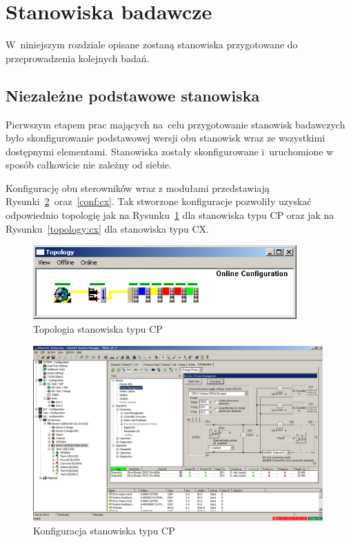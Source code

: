 \section{Stanowiska badawcze}
W~niniejszym rozdziale opisane zostaną stanowiska przygotowane do przeprowadzenia kolejnych badań.

\subsection{Niezależne podstawowe stanowiska}
Pierwszym etapem prac mających na~celu przygotowanie stanowisk badawczych było skonfigurowanie podstawowej wersji obu stanowisk wraz ze wszystkimi dostępnymi elementami. Stanowiska zostały skonfigurowane i~uruchomione w sposób całkowicie nie zależny od siebie.

Konfigurację obu sterowników wraz z modułami przedstawiają Rysunki~\ref{conf:cp}~oraz~\ref{conf:cx}. Tak stworzone konfiguracje pozwoliły uzyskać odpowiednio topologię jak na Rysunku~\ref{topology:cp} dla stanowiska typu CP oraz jak na Rysunku~\ref{topology:cx} dla stanowiska typu CX.
\begin{figure}[!htb] 	\centering 	\includegraphics[width=0.9\textwidth]{images/topologyCP} \caption{Topologia stanowiska typu CP} \label{topology:cp} \end{figure}
\begin{figure}[!htb] 	\centering 	\includegraphics[width=0.99\textwidth]{images/confCP} \caption{Konfiguracja stanowiska typu CP} \label{conf:cp} \end{figure}

